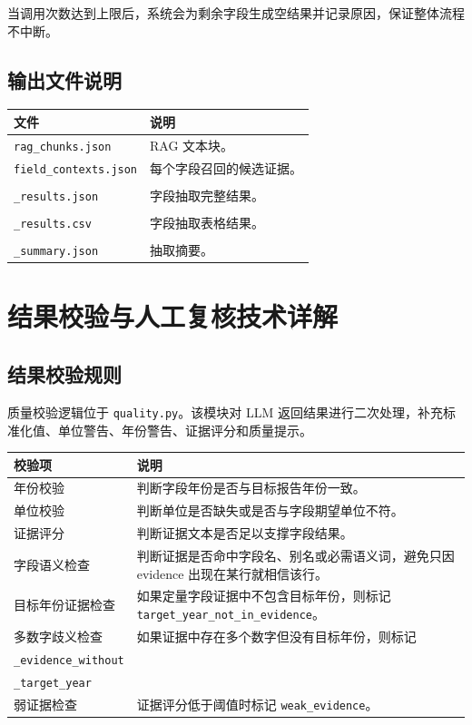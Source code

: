 \documentclass[UTF8,a4paper,12pt]{ctexart}
\newenvironment{manualtable}[1]{%
  \small
  \begin{longtable}{#1}
}{%
  \end{longtable}
  \normalsize
}
\begin{document}
当调用次数达到上限后，系统会为剩余字段生成空结果并记录原因，保证整体流程不中断。

\subsection{输出文件说明}

\begin{manualtable}{p{5cm}p{9cm}}
\toprule
\textbf{文件} & \textbf{说明} \\
\midrule
\endhead
\texttt{rag\_chunks.json} & RAG 文本块。 \\
\texttt{field\_contexts.json} & 每个字段召回的候选证据。 \\
\makecell[l]{\texttt{extraction}\\\texttt{\_results.json}} & 字段抽取完整结果。 \\
\makecell[l]{\texttt{extraction}\\\texttt{\_results.csv}} & 字段抽取表格结果。 \\
\makecell[l]{\texttt{extraction}\\\texttt{\_summary.json}} & 抽取摘要。 \\
\bottomrule
\end{manualtable}

\section{结果校验与人工复核技术详解}

\subsection{结果校验规则}

质量校验逻辑位于 \texttt{quality.py}。该模块对 LLM 返回结果进行二次处理，补充标准化值、单位警告、年份警告、证据评分和质量提示。

\begin{manualtable}{p{5cm}p{9cm}}
\toprule
\textbf{校验项} & \textbf{说明} \\
\midrule
\endhead
年份校验 & 判断字段年份是否与目标报告年份一致。 \\
单位校验 & 判断单位是否缺失或是否与字段期望单位不符。 \\
证据评分 & 判断证据文本是否足以支撑字段结果。 \\
字段语义检查 & 判断证据是否命中字段名、别名或必需语义词，避免只因 evidence 出现在某行就相信该行。 \\
目标年份证据检查 & 如果定量字段证据中不包含目标年份，则标记 \texttt{target\_year\_not\_in\_evidence}。 \\
多数字歧义检查 & 如果证据中存在多个数字但没有目标年份，则标记 \makecell[l]{\texttt{ambiguous\_multi\_number}\\\texttt{\_evidence\_without}\\\texttt{\_target\_year}}。 \\
弱证据检查 & 证据评分低于阈值时标记 \texttt{weak\_evidence}。 \\
\bottomrule
\end{manualtable}
\end{document}
